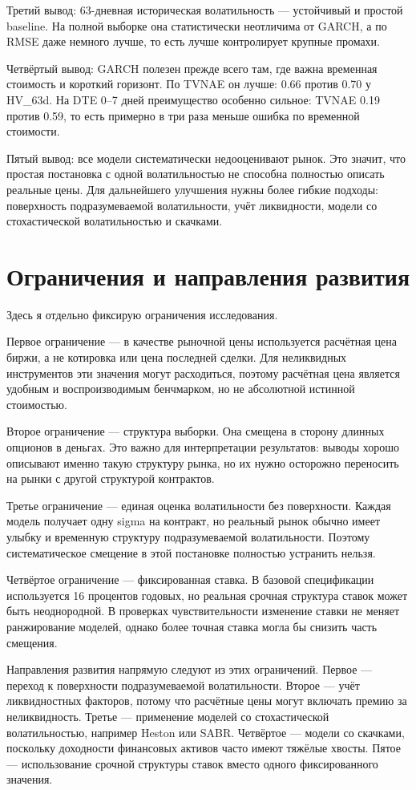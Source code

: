 \documentclass[11pt,a4paper]{article}
\newcommand{\slidetitle}[1]{\section{#1}}
\begin{document}
Третий вывод: 63-дневная историческая волатильность --- устойчивый и простой baseline. На полной выборке она статистически неотличима от GARCH, а по RMSE даже немного лучше, то есть лучше контролирует крупные промахи.

Четвёртый вывод: GARCH полезен прежде всего там, где важна временная стоимость и короткий горизонт. По TVNAE он лучше: 0.66 против 0.70 у HV\_63d. На DTE 0--7 дней преимущество особенно сильное: TVNAE 0.19 против 0.59, то есть примерно в три раза меньше ошибка по временной стоимости.

Пятый вывод: все модели систематически недооценивают рынок. Это значит, что простая постановка с одной волатильностью не способна полностью описать реальные цены. Для дальнейшего улучшения нужны более гибкие подходы: поверхность подразумеваемой волатильности, учёт ликвидности, модели со стохастической волатильностью и скачками.

\slidetitle{Ограничения и направления развития}

Здесь я отдельно фиксирую ограничения исследования.

Первое ограничение --- в качестве рыночной цены используется расчётная цена биржи, а не котировка или цена последней сделки. Для неликвидных инструментов эти значения могут расходиться, поэтому расчётная цена является удобным и воспроизводимым бенчмарком, но не абсолютной истинной стоимостью.

Второе ограничение --- структура выборки. Она смещена в сторону длинных опционов в деньгах. Это важно для интерпретации результатов: выводы хорошо описывают именно такую структуру рынка, но их нужно осторожно переносить на рынки с другой структурой контрактов.

Третье ограничение --- единая оценка волатильности без поверхности. Каждая модель получает одну sigma на контракт, но реальный рынок обычно имеет улыбку и временную структуру подразумеваемой волатильности. Поэтому систематическое смещение в этой постановке полностью устранить нельзя.

Четвёртое ограничение --- фиксированная ставка. В базовой спецификации используется 16 процентов годовых, но реальная срочная структура ставок может быть неоднородной. В проверках чувствительности изменение ставки не меняет ранжирование моделей, однако более точная ставка могла бы снизить часть смещения.

Направления развития напрямую следуют из этих ограничений. Первое --- переход к поверхности подразумеваемой волатильности. Второе --- учёт ликвидностных факторов, потому что расчётные цены могут включать премию за неликвидность. Третье --- применение моделей со стохастической волатильностью, например Heston или SABR. Четвёртое --- модели со скачками, поскольку доходности финансовых активов часто имеют тяжёлые хвосты. Пятое --- использование срочной структуры ставок вместо одного фиксированного значения.
\end{document}
